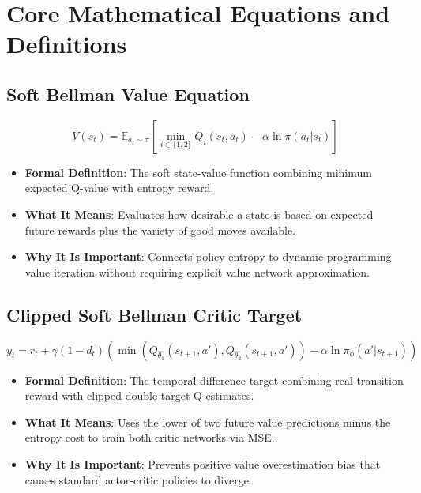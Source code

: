 \documentclass[11pt,a4paper]{article}
\theoremstyle{definition}
\begin{document}
\section{Core Mathematical Equations and Definitions}

\subsection{Soft Bellman Value Equation}
{\boldmath
\begin{equation}
V(s_t) = \mathbb{E}_{a_t \sim \pi} \left[ \min_{i \in \{1, 2\}} Q_i(s_t, a_t) - \alpha \ln \pi(a_t | s_t) \right]
\end{equation}
}
\begin{itemize}
    \item \textbf{Formal Definition}: The soft state-value function combining minimum expected Q-value with entropy reward.
    \item \textbf{What It Means}: Evaluates how desirable a state is based on expected future rewards plus the variety of good moves available.
    \item \textbf{Why It Is Important}: Connects policy entropy to dynamic programming value iteration without requiring explicit value network approximation.
\end{itemize}

\subsection{Clipped Soft Bellman Critic Target}
{\boldmath
\begin{equation}
y_t = r_t + \gamma (1 - d_t) \left( \min(Q_{\bar{\theta}_1}(s_{t+1}, a'), Q_{\bar{\theta}_2}(s_{t+1}, a')) - \alpha \ln \pi_\phi(a' | s_{t+1}) \right)
\end{equation}
}
\begin{itemize}
    \item \textbf{Formal Definition}: The temporal difference target combining real transition reward with clipped double target Q-estimates.
    \item \textbf{What It Means}: Uses the lower of two future value predictions minus the entropy cost to train both critic networks via MSE.
    \item \textbf{Why It Is Important}: Prevents positive value overestimation bias that causes standard actor-critic policies to diverge.
\end{itemize}
\end{document}
